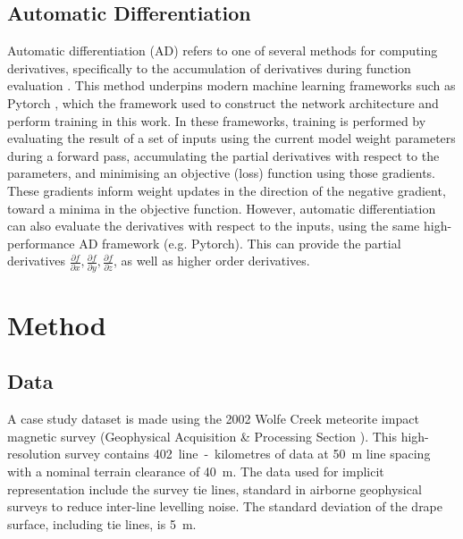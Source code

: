 \documentclass[manuscript.tex]{subfiles}
\begin{document}
\subsection{Automatic Differentiation}
Automatic differentiation (AD) refers to one of several methods for computing derivatives, specifically to the accumulation of derivatives during function evaluation \parencite{baydin2018automatic}.
This method underpins modern machine learning frameworks such as Pytorch \parencite{paszkePyTorchImperativeStyle2019}, which the framework used to construct the network architecture and perform training in this work.
In these frameworks, training is performed by evaluating the result of a set of inputs using the current model weight parameters during a forward pass, accumulating the partial derivatives with respect to the parameters, and minimising an objective (loss) function using those gradients.
These gradients inform weight updates in the direction of the negative gradient, toward a minima in the objective function.
However, automatic differentiation can also evaluate the derivatives with respect to the inputs, using the same high-performance AD framework (e.g. Pytorch).
This can provide the partial derivatives \(\frac{\partial f}{\partial x}, \frac{\partial f}{\partial y}, \frac{\partial f}{\partial z}\), as well as higher order derivatives.

\section{Method}

\subsection{Data}
A case study dataset is made using the 2002 Wolfe Creek meteorite impact magnetic survey (Geophysical Acquisition \& Processing Section \cite*{wolfecreek2019}).
This high-resolution survey contains \SI{402}{line-kilometres} of data at \SI{50}{\m} line spacing with a nominal terrain clearance of \SI{40}{\m}.
The data used for implicit representation include the survey tie lines, standard in airborne geophysical surveys to reduce inter-line levelling noise.
The standard deviation of the drape surface, including tie lines, is \SI{5}{\m}.
\end{document}
